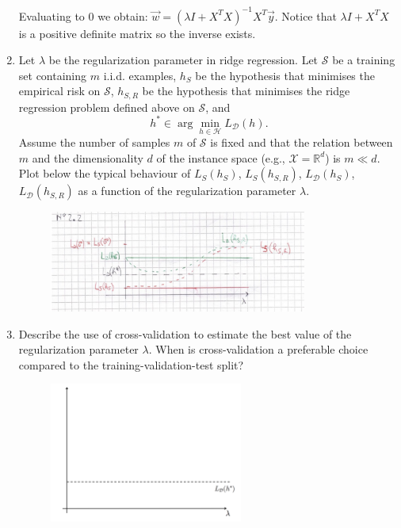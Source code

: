 \documentclass[a4paper,11pt,oneside]{book}
\begin{document}
\begin{enumerate}
\begin{solution}
            Evaluating to 0 we obtain: $\vec{w} = (\lambda I + X^TX)^{-1}X^T\vec{y}$. Notice that $\lambda I + X^TX$ is a positive definite matrix so the inverse exists.
        \end{solution}
    \clearpage
    \item Let $\lambda$ be the regularization parameter in ridge regression. Let $\mathcal{S}$ be a training set containing $m$ i.i.d. examples, $h_S$ be the hypothesis that minimises the empirical risk on $\mathcal{S}$, $h_{S,R}$ be the hypothesis that minimises the ridge regression problem defined above on $\mathcal{S}$, and
        $$h^* \in \arg\min_{h\in\mathcal{H}} L_\mathcal{D}(h).$$
        Assume the number of samples $m$ of $\mathcal{S}$ is fixed and that the relation between $m$ and the dimensionality $d$ of the instance space (e.g., $\mathcal{X} = \mathbb{R}^d$) is $m \ll d$. Plot below the typical behaviour of $L_S(h_S)$, $L_S(h_{S,R})$, $L_\mathcal{D}(h_S)$, $L_\mathcal{D}(h_{S,R})$ as a function of the regularization parameter $\lambda$.
            \begin{solution}
                \begin{figure}[H]
                    \centering
                    \includegraphics[width=0.8\textwidth,height=0.7\textheight,keepaspectratio]{images/2_2_12_Feb_2018.png}
                \end{figure}
            \end{solution}
    \clearpage
    \item Describe the use of cross-validation to estimate the best value of the regularization parameter $\lambda$. When is cross-validation a preferable choice compared to the training-validation-test split?
        \begin{figure}[H]
            \centering
            \includegraphics[width=0.6\textwidth,height=0.4\textheight,keepaspectratio]{images/2_12_Feb_2018.png}
        \end{figure}


\end{enumerate}
\end{document}
